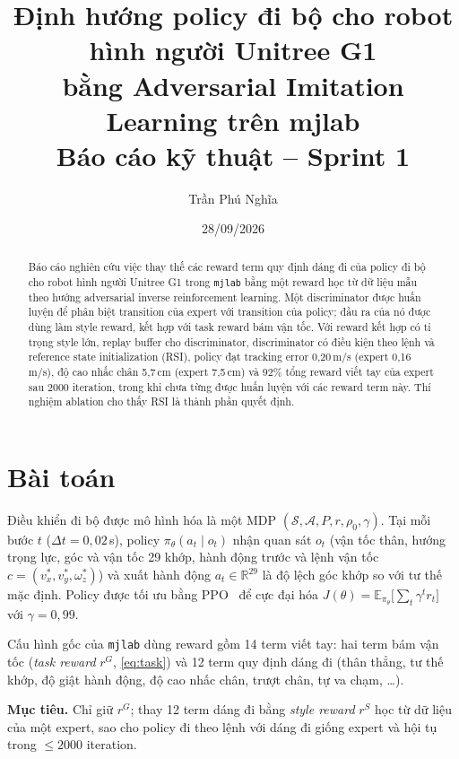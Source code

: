 \documentclass[11pt,a4paper]{article}
\title{\textbf{Định hướng policy đi bộ cho robot hình người Unitree G1\\
bằng Adversarial Imitation Learning trên mjlab}\\[4pt]
\large Báo cáo kỹ thuật -- Sprint 1}
\author{Trần Phú Nghĩa}
\date{28/09/2026}
\newcommand{\E}{\mathbb{E}}
\newcommand{\R}{\mathbb{R}}
\newcommand{\code}[1]{\texttt{#1}}
\begin{document}
\maketitle

\begin{abstract}
\noindent Báo cáo nghiên cứu việc thay thế các reward term quy định dáng đi của policy
đi bộ cho robot hình người Unitree G1 trong \code{mjlab} bằng một reward học từ dữ liệu
mẫu theo hướng adversarial inverse reinforcement learning. Một discriminator được huấn
luyện để phân biệt transition của expert với transition của policy; đầu ra của nó được
dùng làm style reward, kết hợp với task reward bám vận tốc. Với reward kết hợp có tỉ
trọng style lớn, replay buffer cho discriminator, discriminator có điều kiện theo lệnh
và reference state initialization (RSI), policy đạt tracking error 0,20\,m/s (expert
0,16\,m/s), độ cao nhấc chân 5,7\,cm (expert 7,5\,cm) và 92\% tổng reward viết tay của
expert sau 2000 iteration, trong khi chưa từng được huấn luyện với các reward term này.
Thí nghiệm ablation cho thấy RSI là thành phần quyết định.
\end{abstract}

\section{Bài toán}
Điều khiển đi bộ được mô hình hóa là một MDP $(\mathcal{S}, \mathcal{A}, P, r, \rho_0,
\gamma)$. Tại mỗi bước $t$ ($\Delta t = 0{,}02$\,s), policy $\pi_\theta(a_t \mid o_t)$ nhận
quan sát $o_t$ (vận tốc thân, hướng trọng lực, góc và vận tốc 29 khớp, hành động trước
và lệnh vận tốc $c = (v_x^*, v_y^*, \omega_z^*)$) và xuất hành động $a_t \in \R^{29}$ là
độ lệch góc khớp so với tư thế mặc định. Policy được tối ưu bằng PPO~\cite{schulman2017ppo}
để cực đại hóa $J(\theta) = \E_{\pi_\theta}\big[\sum_t \gamma^t r_t\big]$ với
$\gamma = 0{,}99$.

Cấu hình gốc của \code{mjlab} dùng reward gồm 14 term viết tay: hai term bám vận tốc
(\emph{task reward} $r^G$, \cref{eq:task}) và 12 term quy định dáng đi (thân thẳng, tư thế
khớp, độ giật hành động, độ cao nhấc chân, trượt chân, tự va chạm, \ldots).

\textbf{Mục tiêu.} Chỉ giữ $r^G$; thay 12 term dáng đi bằng \emph{style reward} $r^S$
học từ dữ liệu của một expert, sao cho policy đi theo lệnh với dáng đi giống expert và
hội tụ trong $\le 2000$ iteration.
\end{document}
